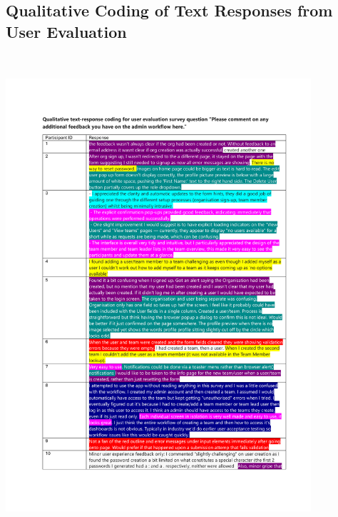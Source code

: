 \documentclass{l4proj}
\begin{document}
\begin{appendices}
\chapter{Qualitative Coding of Text Responses from User Evaluation}
\label{app: qualitative coding}
\\
\centerline{
\includegraphics[width=0.85\textwidth, page=1]{dissertation/appendices/Qualitative coding of text responses.pdf}
}



\end{appendices}






\end{document}
